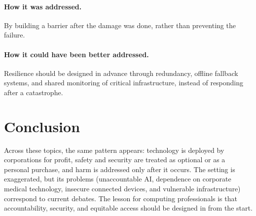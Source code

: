 \documentclass{article}%
\begin{document}
\paragraph{How it was addressed.}
By building a barrier after the damage was done, rather than preventing the failure.

\paragraph{How it could have been better addressed.}
Resilience should be designed in advance through redundancy, offline fallback systems, and shared monitoring of critical infrastructure, instead of responding after a catastrophe.

\section{Conclusion}
Across these topics, the same pattern appears: technology is deployed by corporations for profit, safety and security are treated as optional or as a personal purchase, and harm is addressed only after it occurs. The setting is exaggerated, but its problems (unaccountable AI, dependence on corporate medical technology, insecure connected devices, and vulnerable infrastructure) correspond to current debates. The lesson for computing professionals is that accountability, security, and equitable access should be designed in from the start.
\end{document}
